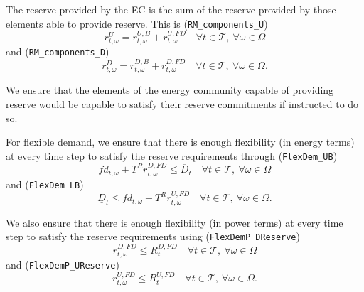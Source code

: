 The reserve provided by the EC is the sum of the reserve provided by those elements able to provide reserve. This is (\verb|RM_components_U|)
\begin{equation} \label{EQ:RUcomp}
    r^{U}_{t, \omega} = r^{U, B}_{t, \omega} +  r^{U, FD}_{t, \omega} \quad \forall t \in \mathcal{T}, \ \forall \omega \in \Omega
\end{equation}
and (\verb|RM_components_D|)
\begin{equation} \label{EQ:RDcomp}
	r^{D}_{t, \omega} = r^{D, B}_{t, \omega} +  r^{D, FD}_{t, \omega} \quad \forall t \in \mathcal{T}, \ \forall \omega \in \Omega.
\end{equation}


We ensure that the elements of the energy community capable of providing reserve would be capable to satisfy their reserve commitments if instructed to do so. 

For flexible demand, we ensure that there is enough flexibility (in energy terms) at every time step to satisfy the reserve requirements through (\verb|FlexDem_UB|)
\begin{equation} \label{EQ:FlexDemand_UB}
	fd_{t, \omega} + T^R r^{D, FD}_{t, \omega} \leq \overline{D}_t \quad \forall t \in \mathcal{T}, \ \forall \omega \in \Omega
\end{equation}
and (\verb|FlexDem_LB|)
\begin{equation} \label{EQ:FlexDemand_LB}
	\underline{D}_t \leq fd_{t, \omega} - T^R r^{U, FD}_{t, \omega} \quad \forall t \in \mathcal{T}, \ \forall \omega \in \Omega.
\end{equation}

We also ensure that there is enough flexibility (in power terms) at every time step to satisfy the reserve requirements using (\verb|FlexDemP_DReserve|)
\begin{equation} \label{EQ:FlexDemP_DReserve}
	r^{D, FD}_{t, \omega} \leq R^{D, FD}_t \quad \forall t \in \mathcal{T}, \ \forall \omega \in \Omega
\end{equation}
and (\verb|FlexDemP_UReserve|)
\begin{equation} \label{EQ:FlexDemP_UReserve}
	r^{U, FD}_{t, \omega} \leq R^{U, FD}_t \quad \forall t \in \mathcal{T}, \ \forall \omega \in \Omega.
\end{equation}

